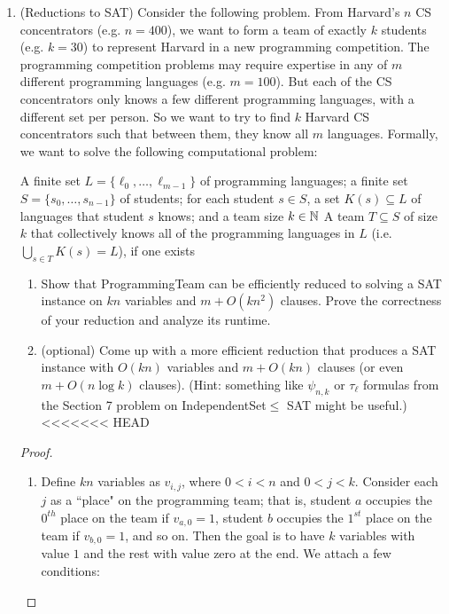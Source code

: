 \documentclass[11pt]{article}
\begin{document}
\begin{enumerate}
\begin{proof}[Solution]
\end{proof}
  
\item (Reductions to SAT)  Consider the following problem.  From Harvard's $n$ CS concentrators (e.g. $n=400$), we want to form a team of exactly $k$ students (e.g. $k=30$) to represent Harvard in a new programming competition.  The programming competition problems may require expertise in any of $m$ different programming languages (e.g. $m=100$).  But each of the CS concentrators only knows a few different programming languages, with a different set per person. So we want to try to find $k$ Harvard CS concentrators such that between them, they know all $m$ languages. Formally, we want to solve the following computational problem:

{A finite set $L=\{\ell_0,\ldots,\ell_{m-1}\}$ of programming languages; a finite set 
$S=\{s_0,\ldots,s_{n-1}\}$ of students; for each student $s\in S$, a set $K(s)\subseteq L$ of languages that student $s$ knows; and a team size $k\in \mathbb{N}$}
{A team $T\subseteq S$ of size $k$ that collectively knows all of the programming languages in $L$ (i.e. $\bigcup_{s\in T} K(s)=L$), if one exists}

\begin{enumerate}
    \item 
Show that ProgrammingTeam can be efficiently reduced to solving a SAT instance on $kn$ variables and $m+O(kn^2)$ clauses.  Prove the correctness of your reduction and analyze its runtime.

\item 
(optional\footnotemark[1])
Come up with a more efficient reduction that produces a SAT instance with $O(kn)$ variables and $m+O(kn)$ clauses (or even $m+O(n\log k)$ clauses). (Hint: something like $\psi_{n,k}$ or $\tau_\ell$ formulas from the Section 7 problem on IndependentSet$\leq$ SAT might be useful.)
<<<<<<< HEAD
\end{enumerate}

\begin{proof}
\begin{enumerate}

\item Define $kn$ variables as $v_{i, j}$, where $0 < i < n$ and $0 < j < k$. Consider each $j$ as a ``place" on the programming team; that is, student $a$ occupies the $0^{th}$ place on the team if $v_{a, 0} = 1$, student $b$ occupies the $1^{st}$ place on the team if $v_{b, 0} = 1$, and so on. Then the goal is to have $k$ variables with value $1$ and the rest with value zero at the end. We attach a few conditions:


\end{enumerate}
\end{proof}
\end{enumerate}
\end{document}
